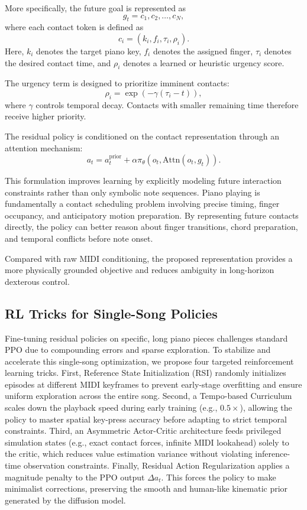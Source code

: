 \documentclass{article}
\newcommand{\residual}{\Delta a}
\begin{document}
More specifically, the future goal is represented as
\begin{equation}g_t={c_1, c_2, \dots, c_N},\end{equation}
where each contact token is defined as
\begin{equation}c_i=(k_i,f_i,\tau_i,\rho_i).
\end{equation}
Here, $k_i$ denotes the target piano key, $f_i$ denotes the assigned finger, $\tau_i$ denotes the desired contact time, and $\rho_i$ denotes a learned or heuristic urgency score.

The urgency term is designed to prioritize imminent contacts:
\begin{equation}
\rho_i=\exp(-\gamma (\tau_i - t)),
\end{equation}
where $\gamma$ controls temporal decay. Contacts with smaller remaining time therefore receive higher priority.

The residual policy is conditioned on the contact representation through an attention mechanism:
\begin{equation}a_t=a_t^{\mathrm{prior}}+\alpha\pi_\theta(o_t,\mathrm{Attn}(o_t, g_t)).\end{equation}

This formulation improves learning by explicitly modeling future interaction constraints rather than only symbolic note sequences. Piano playing is fundamentally a contact scheduling problem involving precise timing, finger occupancy, and anticipatory motion preparation. By representing future contacts directly, the policy can better reason about finger transitions, chord preparation, and temporal conflicts before note onset.

Compared with raw MIDI conditioning, the proposed representation provides a more physically grounded objective and reduces ambiguity in long-horizon dexterous control.

\subsection{RL Tricks for Single-Song Policies}

Fine-tuning residual policies on specific, long piano pieces challenges standard PPO due to compounding errors and sparse exploration. To stabilize and accelerate this single-song optimization, we propose four targeted reinforcement learning tricks. First, Reference State Initialization (RSI) randomly initializes episodes at different MIDI keyframes to prevent early-stage overfitting and ensure uniform exploration across the entire song. Second, a Tempo-based Curriculum scales down the playback speed during early training (e.g., $0.5\times$), allowing the policy to master spatial key-press accuracy before adapting to strict temporal constraints. Third, an Asymmetric Actor-Critic architecture feeds privileged simulation states (e.g., exact contact forces, infinite MIDI lookahead) solely to the critic, which reduces value estimation variance without violating inference-time observation constraints. Finally, Residual Action Regularization applies a magnitude penalty to the PPO output $\residual_t$. This forces the policy to make minimalist corrections, preserving the smooth and human-like kinematic prior generated by the diffusion model.
\end{document}
